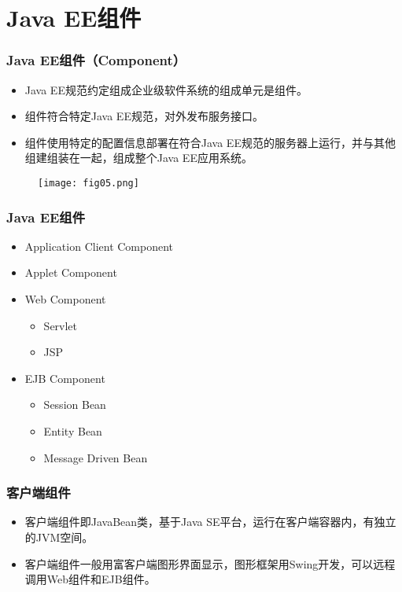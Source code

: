 \section{Java EE组件}
\begin{frame}
\frametitle{Java EE组件（Component）} 

\begin{itemize}
\item Java EE规范约定组成企业级软件系统的组成单元是组件。
\item 组件符合特定Java EE规范，对外发布服务接口。
\item 组件使用特定的配置信息部署在符合Java EE规范的服务器上运行，并与其他组建组装在一起，组成整个Java EE应用系统。
\end{itemize}
\begin{figure}
\centering
\texttt{[image: fig05.png]}
\end{figure}
\end{frame}

\begin{frame}
\frametitle{Java EE组件} 
\begin{itemize}
\item Application Client Component 
\item Applet Component
\item Web Component
  \begin{itemize}
  \item Servlet 
  \item JSP
  \end{itemize}
\item EJB Component
  \begin{itemize}
  \item Session Bean
  \item Entity Bean
  \item Message Driven Bean
  \end{itemize}
\end{itemize}
\end{frame}

\begin{frame}
\frametitle{客户端组件} 
\begin{itemize}
\item 客户端组件即JavaBean类，基于Java SE平台，运行在客户端容器内，有独立的JVM空间。
\item 客户端组件一般用富客户端图形界面显示，图形框架用Swing开发，可以远程调用Web组件和EJB组件。
\end{itemize}
\end{frame}

